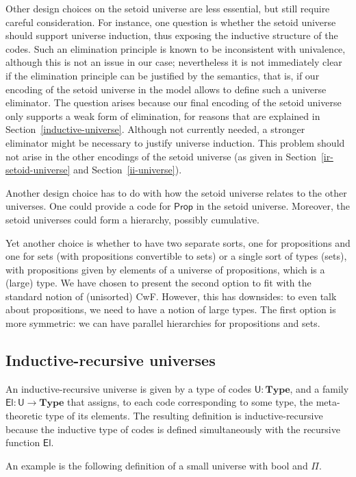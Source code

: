 \documentclass[autoref]{llncs}
\newcommand{\mType}{\mathbf{Type}}
\newcommand{\Prop}{\textsf{Prop}}
\newcommand{\U}{\textsf{U}}
\newcommand{\El}{\textsf{El}}
\begin{document}
Other design choices on the setoid universe are less essential, but still
require careful consideration. For instance, one question is whether the setoid
universe should support universe induction, thus exposing the inductive
structure of the codes. Such an elimination principle is known to be inconsistent
with univalence, although this is not an issue in our case; nevertheless it is
not immediately clear if the elimination principle can be justified by the
semantics, that is, if our encoding of the setoid universe in the model allows
to define such a universe eliminator.
%
The question arises because our final encoding of the setoid universe only
supports a weak form of elimination, for reasons that are explained in
Section~\ref{inductive-universe}. Although not currently needed, a stronger
eliminator might be necessary to justify universe induction. This problem should
not arise in the other encodings of the setoid universe (as given in
Section~\ref{ir-setoid-universe} and Section~\ref{ii-universe}).

Another design choice has to do with how the setoid universe relates to the
other universes. One could provide a code for $\Prop$ in the setoid universe.
Moreover, the setoid universes could form a hierarchy, possibly
cumulative.

Yet another choice is whether to have two separate sorts, one for propositions
and one for sets (with propositions convertible to sets) or a single sort of
types (sets), with propositions given by elements of a universe of propositions,
which is a (large) type. We have chosen to present the second option to fit with
the standard notion of (unisorted) CwF. However, this has downsides: to even
talk about propositions, we need to have a notion of large types. The first
option is more symmetric: we can have parallel hierarchies for propositions and
sets.

\subsection{Inductive-recursive universes}\label{ir-universes}

An inductive-recursive universe is given by a type of codes $\U : \mType$, and a
family $\El : \U \to \mType$ that assigns, to each code corresponding to some
type, the meta-theoretic type of its elements. The resulting definition is
inductive-recursive because the inductive type of codes is defined
simultaneously with the recursive function $\El$.

An example is the following definition of a small universe with
bool and $\Pi$.
\end{document}
